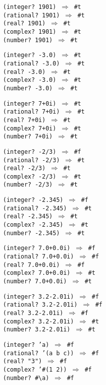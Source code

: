 \begin{alltt}
(integer? 1901) \(\Rightarrow\) \#{}t
(rational? 1901) \(\Rightarrow\) \#{}t
(real? 1901) \(\Rightarrow\) \#{}t
(complex? 1901) \(\Rightarrow\) \#{}t
(number? 1901) \(\Rightarrow\) \#{}t

(integer? -3.0) \(\Rightarrow\) \#{}t
(rational? -3.0) \(\Rightarrow\) \#{}t
(real? -3.0) \(\Rightarrow\) \#{}t
(complex? -3.0) \(\Rightarrow\) \#{}t
(number? -3.0) \(\Rightarrow\) \#{}t

(integer? 7+0i) \(\Rightarrow\) \#{}t
(rational? 7+0i) \(\Rightarrow\) \#{}t
(real? 7+0i) \(\Rightarrow\) \#{}t
(complex? 7+0i) \(\Rightarrow\) \#{}t
(number? 7+0i) \(\Rightarrow\) \#{}t

(integer? -2/3) \(\Rightarrow\) \#{}f
(rational? -2/3) \(\Rightarrow\) \#{}t
(real? -2/3) \(\Rightarrow\) \#{}t
(complex? -2/3) \(\Rightarrow\) \#{}t
(number? -2/3) \(\Rightarrow\) \#{}t

(integer? -2.345) \(\Rightarrow\) \#{}f
(rational? -2.345) \(\Rightarrow\) \#{}t
(real? -2.345) \(\Rightarrow\) \#{}t
(complex? -2.345) \(\Rightarrow\) \#{}t
(number? -2.345) \(\Rightarrow\) \#{}t

(integer? 7.0+0.0i) \(\Rightarrow\) \#{}f
(rational? 7.0+0.0i) \(\Rightarrow\) \#{}f
(real? 7.0+0.0i) \(\Rightarrow\) \#{}f
(complex? 7.0+0.0i) \(\Rightarrow\) \#{}t
(number? 7.0+0.0i) \(\Rightarrow\) \#{}t

(integer? 3.2-2.01i) \(\Rightarrow\) \#{}f
(rational? 3.2-2.01i) \(\Rightarrow\) \#{}f
(real? 3.2-2.01i) \(\Rightarrow\) \#{}f
(complex? 3.2-2.01i) \(\Rightarrow\) \#{}t
(number? 3.2-2.01i) \(\Rightarrow\) \#{}t

(integer? 'a) \(\Rightarrow\) \#{}f
(rational? '(a b c)) \(\Rightarrow\) \#{}f
(real? "3") \(\Rightarrow\) \#{}f
(complex? '\#{}(1 2)) \(\Rightarrow\) \#{}f
(number? \#{}\textbackslash{}a) \(\Rightarrow\) \#{}f
\end{alltt}

